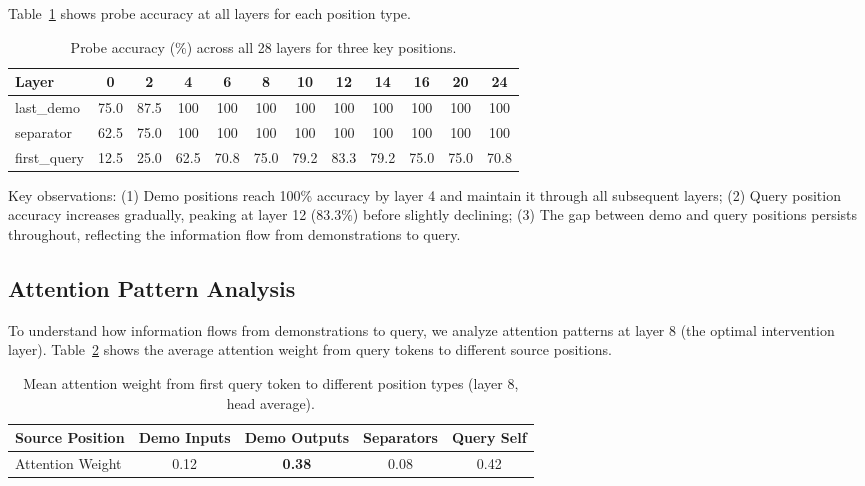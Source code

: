 \documentclass[sigconf,anonymous]{acmart}
\begin{document}
Table~\ref{tab:full_probing} shows probe accuracy at all layers for each position type.

\begin{table}[h]
\centering
\small
\caption{Probe accuracy (\%) across all 28 layers for three key positions.}
\label{tab:full_probing}
\begin{tabular}{@{}lccccccccccc@{}}
\toprule
Layer & 0 & 2 & 4 & 6 & 8 & 10 & 12 & 14 & 16 & 20 & 24 \\
\midrule
last\_demo & 75.0 & 87.5 & 100 & 100 & 100 & 100 & 100 & 100 & 100 & 100 & 100 \\
separator & 62.5 & 75.0 & 100 & 100 & 100 & 100 & 100 & 100 & 100 & 100 & 100 \\
first\_query & 12.5 & 25.0 & 62.5 & 70.8 & 75.0 & 79.2 & 83.3 & 79.2 & 75.0 & 75.0 & 70.8 \\
\bottomrule
\end{tabular}
\end{table}

Key observations: (1) Demo positions reach 100\% accuracy by layer 4 and maintain it through all subsequent layers; (2) Query position accuracy increases gradually, peaking at layer 12 (83.3\%) before slightly declining; (3) The gap between demo and query positions persists throughout, reflecting the information flow from demonstrations to query.

\subsection{Attention Pattern Analysis}

To understand how information flows from demonstrations to query, we analyze attention patterns at layer 8 (the optimal intervention layer). Table~\ref{tab:attention} shows the average attention weight from query tokens to different source positions.

\begin{table}[h]
\centering
\small
\caption{Mean attention weight from first query token to different position types (layer 8, head average).}
\label{tab:attention}
\begin{tabular}{@{}lcccc@{}}
\toprule
Source Position & Demo Inputs & Demo Outputs & Separators & Query Self \\
\midrule
Attention Weight & 0.12 & \textbf{0.38} & 0.08 & 0.42 \\
\bottomrule
\end{tabular}
\end{table}
\end{document}
